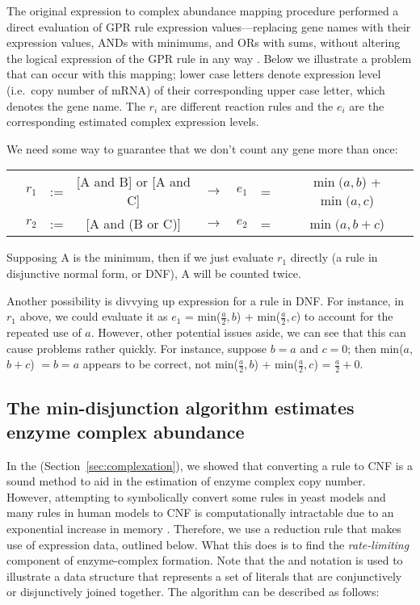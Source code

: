 The original expression to complex abundance mapping procedure
performed a direct evaluation of GPR rule expression
values---replacing gene names with their expression values, ANDs with
minimums, and ORs with sums, without altering the logical expression
of the GPR rule in any way \citep{Lee2012}. Below we illustrate a 
problem that can occur with this mapping; lower case letters
denote expression level (i.e.\ copy number of mRNA) of their
corresponding upper case letter, which denotes the gene name. The
$r_i$ are different reaction rules and the $e_i$ are the corresponding
estimated complex expression levels.

We need some way to guarantee that we don’t count any gene more than once: 
\begin{AlgFloat}[H]
{\setlength{\tabcolsep}{.16667em}
\begin{tabular}{cccccccc}
& $r_1$ & := & [A and B] or [A and C] & $\rightarrow$ & $e_1$  &=& $\min(a,b$) + $\min(a,c$) \\ 
& $r_2$ & := & [A and (B or C)]       & $\rightarrow$ & $e_2$  &=&  $\min(a, b + c$) 
\end{tabular} 
}
\end{AlgFloat}

Supposing A is the minimum, then if we just evaluate $r_1$ directly (a
rule in disjunctive normal form, or DNF), A will be counted twice.

Another possibility is divvying up expression for a rule in DNF. For
instance, in $r_1$ above, we could evaluate it as $e_1$ =
min($\frac{a}{2},b$) + min($\frac{a}{2},c$) to account for the
repeated use of $a$. However, other potential issues aside, we can see
that this can cause problems rather quickly. For instance, suppose $b
= a$ and $c = 0$; then min($a$,$b+c$) $=b=a$ appears to be correct,
not min($\frac{a}{2},b$) + min($\frac{a}{2},c$) = $\frac{a}{2} + 0$.

\subsection{The min-disjunction algorithm estimates \\enzyme complex abundance}

In the \suppOrApp (Section~\ref{sec:complexation}), we showed that
converting a rule to CNF is a sound method to aid in the estimation of
enzyme complex copy number.  However, attempting to symbolically
convert some rules in yeast models and many rules in human models to
CNF is computationally intractable due to an exponential increase in
memory \citep{Russell2009}. Therefore, we use a reduction rule that
makes use of expression data, outlined below. What this does is to
find the \emph{rate-limiting} component of enzyme-complex
formation. Note that the \ANDw and \ORw notation is used to illustrate
a data structure that represents a set of literals that are
conjunctively or disjunctively joined together. The algorithm can be
described as follows:

